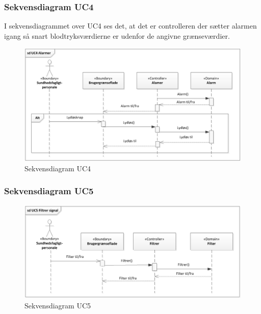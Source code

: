 \subsubsection{Sekvensdiagram UC4}
I sekvensdiagrammet over UC4 ses det, at det er controlleren der sætter alarmen igang så snart blodtryksværdierne er udenfor de angivne grænseværdier. 
\begin{figure}[H]
\centering
\includegraphics[scale=0.70]{sd4.PNG}
\caption{Sekvensdiagram UC4}
\end{figure}

\subsubsection{Sekvensdiagram UC5}
\begin{figure}[H]
\centering
\includegraphics[scale=0.70]{sd5.PNG}
\caption{Sekvensdiagram UC5}
\end{figure}

